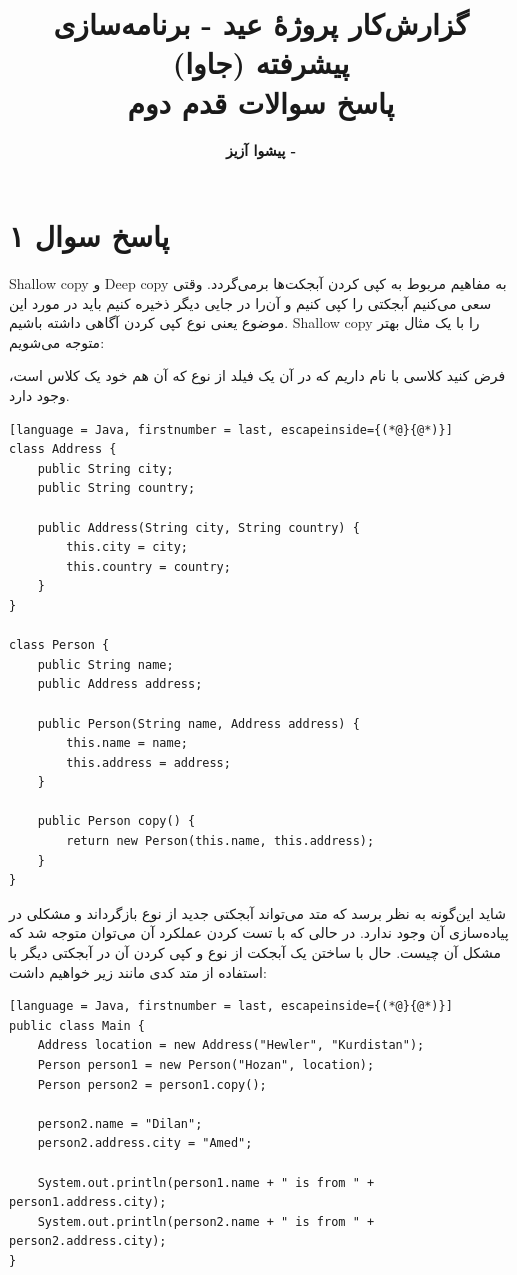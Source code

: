 \documentclass{article}
\title{\textbf{گزارش‌کار پروژۀ عید - برنامه‌سازی پیشرفته (جاوا)}\vspace{1cm}\\پاسخ سوالات قدم دوم}
\author{\textbf{پیشوا آزیز - \lr{40313003}}}
\date{}
\begin{document}
\maketitle

\vspace{2cm}

\section*{پاسخ سوال ۱}

Shallow copy و Deep copy به مفاهیم مربوط به کپی کردن آبجکت‌ها برمی‌گردد. وقتی سعی می‌کنیم آبجکتی را کپی کنیم و آن‌را در جایی دیگر ذخیره کنیم باید در مورد این موضوع یعنی نوع کپی کردن آگاهی داشته باشیم.
Shallow copy را با یک مثال بهتر متوجه می‌شویم:

فرض کنید کلاسی با نام  داریم که در آن یک فیلد از نوع  که آن هم خود یک کلاس است، وجود دارد.

\begin{latin}
\begin{lstlisting}[language = Java, firstnumber = last, escapeinside={(*@}{@*)}]
class Address {
    public String city;
    public String country;

    public Address(String city, String country) {
        this.city = city;
        this.country = country;
    }
}

class Person {
    public String name;
    public Address address;

    public Person(String name, Address address) {
        this.name = name;
        this.address = address;
    }

    public Person copy() {
        return new Person(this.name, this.address);
    }
}
\end{lstlisting}
\end{latin}

شاید این‌گونه به نظر برسد که متد  می‌تواند آبجکتی جدید از نوع  بازگرداند و مشکلی در پیاده‌سازی آن وجود ندارد. در حالی که با تست کردن عملکرد آن می‌توان متوجه شد که مشکل آن چیست. حال با ساختن یک آبجکت از نوع  و کپی کردن آن در آبجکتی دیگر با استفاده از متد  کدی مانند زیر خواهیم داشت:

\begin{latin}
\begin{lstlisting}[language = Java, firstnumber = last, escapeinside={(*@}{@*)}]
public class Main {
    Address location = new Address("Hewler", "Kurdistan");
    Person person1 = new Person("Hozan", location);
    Person person2 = person1.copy();

    person2.name = "Dilan";
    person2.address.city = "Amed";

    System.out.println(person1.name + " is from " + person1.address.city);
    System.out.println(person2.name + " is from " + person2.address.city);
}
\end{lstlisting}
\end{latin}
\end{document}
